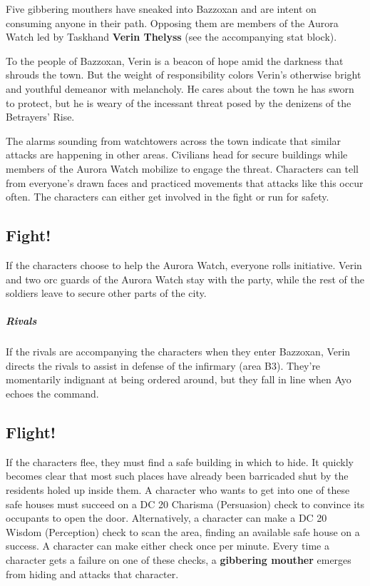 \documentclass[10pt,a4paper,twoside,fancy,bg=print,twocolumn,openany,nodeprecatedcode]{dndbook}
\begin{document}
Five gibbering mouthers have sneaked into Bazzoxan and are intent on consuming anyone in their path. Opposing them are members of the Aurora Watch led by Taskhand \textbf{Verin Thelyss} (see the accompanying stat block).

To the people of Bazzoxan, Verin is a beacon of hope amid the darkness that shrouds the town. But the weight of responsibility colors Verin's otherwise bright and youthful demeanor with melancholy. He cares about the town he has sworn to protect, but he is weary of the incessant threat posed by the denizens of the Betrayers' Rise.

The alarms sounding from watchtowers across the town indicate that similar attacks are happening in other areas. Civilians head for secure buildings while members of the Aurora Watch mobilize to engage the threat. Characters can tell from everyone's drawn faces and practiced movements that attacks like this occur often. The characters can either get involved in the fight or run for safety.

\subsection{Fight!}
If the characters choose to help the Aurora Watch, everyone rolls initiative. Verin and two orc guards of the Aurora Watch stay with the party, while the rest of the soldiers leave to secure other parts of the city.

\subparagraph{Rivals}
If the rivals are accompanying the characters when they enter Bazzoxan, Verin directs the rivals to assist in defense of the infirmary (area B3). They're momentarily indignant at being ordered around, but they fall in line when Ayo echoes the command.

\subsection{Flight!}
If the characters flee, they must find a safe building in which to hide. It quickly becomes clear that most such places have already been barricaded shut by the residents holed up inside them. A character who wants to get into one of these safe houses must succeed on a DC 20 Charisma (Persuasion) check to convince its occupants to open the door. Alternatively, a character can make a DC 20 Wisdom (Perception) check to scan the area, finding an available safe house on a success. A character can make either check once per minute. Every time a character gets a failure on one of these checks, a \textbf{gibbering mouther} emerges from hiding and attacks that character.
\end{document}
